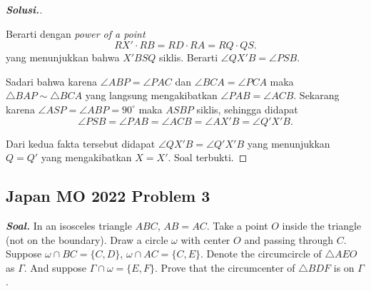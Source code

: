 \documentclass[letterpaper, 13pt]{scrartcl}
\begin{document}
\begin{proof}[\textbf{Solusi.}]
\begin{center}
\begin{tikzpicture}[scale=0.5, dot/.style={circle, fill, inner sep=0.5pt, outer sep=0pt}]
    \end{tikzpicture}
\end{center}

Berarti dengan \textit{power of a point}
$$RX'\cdot RB = RD\cdot RA = RQ\cdot QS.$$
yang menunjukkan bahwa $X'BSQ$ siklis. Berarti $\angle QX'B = \angle PSB$.

Sadari bahwa karena $\angle ABP = \angle PAC$ dan $\angle BCA = \angle PCA$ maka $\triangle BAP \sim \triangle BCA$ yang langsung mengakibatkan $\angle PAB = \angle ACB$.
Sekarang karena $\angle ASP = \angle ABP = 90^\circ$ maka $ASBP$ siklis, sehingga didapat $$\angle PSB = \angle PAB = \angle ACB = \angle AX'B = \angle Q'X'B.$$

Dari kedua fakta tersebut didapat $\angle QX'B = \angle Q'X'B$ yang menunjukkan $Q = Q'$ yang mengakibatkan $X = X'$. Soal terbukti.
\end{proof}

\subsection{Japan MO 2022 Problem 3}

\textbf{\textit{Soal. }}In an isosceles triangle $ABC$, $AB=AC$. Take a point $O$ inside the triangle (not on the boundary). Draw a circle $\omega$ with center $O$ and passing through $C$. Suppose $\omega\cap BC=\{C,D\}$, $\omega\cap AC=\{C,E\}$. Denote the circumcircle of $\triangle AEO$ as $\Gamma$. And suppose $\Gamma\cap\omega=\{E,F\}$. Prove that the circumcenter of $\triangle BDF$ is on $\Gamma$.
\end{document}
